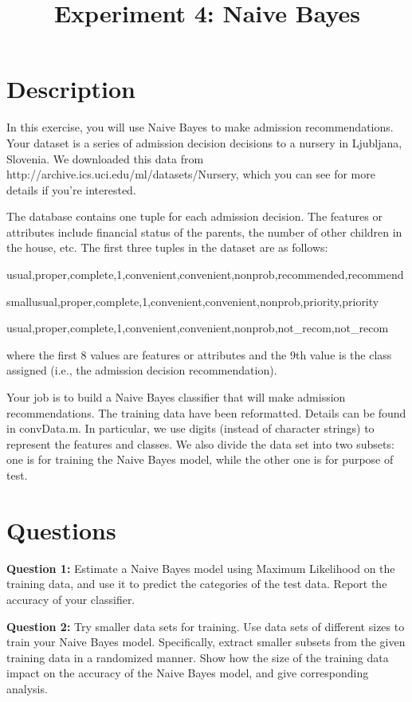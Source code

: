 \documentclass[10pt,a4paper]{article}
\begin{document}
\title{Experiment 4: Naive Bayes}

\maketitle
  
\section{Description}
%
  In this exercise, you will use Naive Bayes to make admission recommendations. Your dataset is a series of admission decision decisions to a nursery in Ljubljana, Slovenia. We downloaded this data from http://archive.ics.uci.edu/ml/datasets/Nursery, which you can see for more details if you’re interested.


  The database contains one tuple for each admission decision. The features or attributes include financial status of the parents, the number of other children in the house, etc. The first three tuples in the dataset are as follows:
  
  \vspace{2ex}
  \hspace{-1ex}\small{usual,proper,complete,1,convenient,convenient,nonprob,recommended,recommend}

  \hspace{-1ex}small{usual,proper,complete,1,convenient,convenient,nonprob,priority,priority}

  \hspace{-1ex}\small{usual,proper,complete,1,convenient,convenient,nonprob,not\_recom,not\_recom}
  \vspace{2ex}

  \noindent where the first 8 values are features or attributes and the 9th value is the class assigned (i.e., the admission decision recommendation).


  Your job is to build a Naive Bayes classifier that will make admission recommendations. The training data have been reformatted. Details can be found in \textsf{convData.m}. In particular, we use digits (instead of character strings) to represent the features and classes. We also divide the data set into two subsets: one is for training the Naive Bayes model, while the other one is for purpose of test.

\section{Questions}

  \textbf{Question 1:} Estimate a Naive Bayes model using Maximum Likelihood on the training data, and use it to predict the categories of the test data. Report the accuracy of your classifier.

  \noindent\textbf{Question 2:} Try smaller data sets for training. Use data sets of different sizes to train your Naive Bayes model. Specifically, extract smaller subsets from the given training data in a randomized manner. Show how the size of the training data impact on the accuracy of the Naive Bayes model, and give corresponding analysis.
\end{document}
